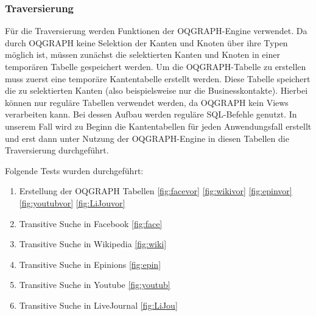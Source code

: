 \phantom{Platzhalter wegen verwirrender Figure-Platzierung}

\subsubsection{Traversierung}
Für die Traversierung werden Funktionen der OQGRAPH-Engine verwendet. Da durch OQGRAPH keine Selektion der Kanten und Knoten über ihre Typen möglich ist, müssen zunächst die selektierten Kanten und Knoten in einer temporären Tabelle gespeichert werden. Um die OQGRAPH-Tabelle zu erstellen muss zuerst eine temporäre Kantentabelle erstellt werden. Diese Tabelle speichert die zu selektierten Kanten (also beispielsweise nur die Businesskontakte). Hierbei können nur reguläre Tabellen verwendet werden, da OQGRAPH kein Views verarbeiten kann. Bei dessen Aufbau werden reguläre SQL-Befehle genutzt. In unserem Fall wird zu Beginn die Kantentabellen für jeden Anwendungsfall erstellt und erst dann unter Nutzung der OQGRAPH-Engine in diesen Tabellen die Traversierung durchgeführt.

Folgende Tests wurden durchgeführt:
\begin{enumerate}
	\item Erstellung der OQGRAPH Tabellen \ref{fig:facevor}
	\ref{fig:wikivor}
	\ref{fig:epinvor}
	\ref{fig:youtubvor}
	\ref{fig:LiJouvor}
	\item Transitive Suche in Facebook
	\ref{fig:face}
	\item Transitive Suche in Wikipedia
	\ref{fig:wiki}
	\item Transitive Suche in Epinions 
	\ref{fig:epin}
	\item Transitive Suche in Youtube 
	\ref{fig:youtub}
	\item Transitive Suche in LiveJournal 
	\ref{fig:LiJou}
\end{enumerate}

